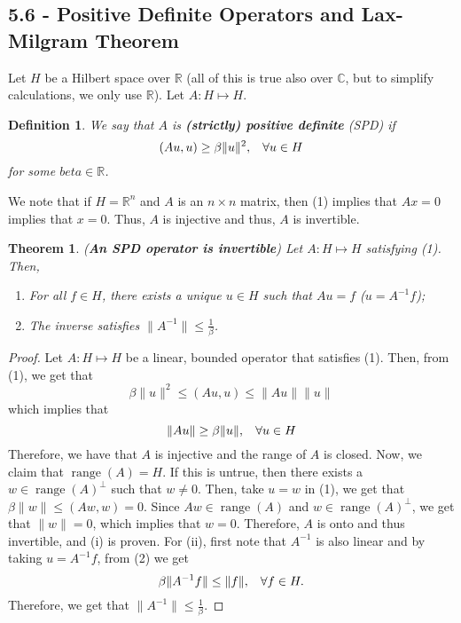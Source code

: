 \documentclass[12pt]{article}
\newtheorem{theorem}{Theorem}
\newtheorem{definition}{Definition}
\newcommand{\R}{{\mathbb R}}
\newcommand{\C}{{\mathbb C}}
\DeclareMathOperator{\range}{range}
\newcommand{\Ai}{A^{-1}}
\begin{document}
\subsection*{5.6 - Positive Definite Operators and Lax-Milgram Theorem}
\setcounter{equation}{0}
Let $H$ be a Hilbert space over $\R$ (all of this is true also over $\C$, but to simplify calculations, we only use $\R$). Let $A: H \mapsto H$.
\begin{definition}
We say that $A$ is \textbf{(strictly) positive definite} (SPD) if 
\begin{equation}
(Au, u) \geq \beta \| u \|^2, \hspace{3mm} \forall u \in H
\end{equation}
for some $beta \in \R$. 
\end{definition}
\vspace{-20pt}
We note that if $H = \R^n$ and $A$ is an $n \times n$ matrix, then (1) implies that $Ax = 0$ implies that $x = 0$. Thus, $A$ is injective and thus, $A$ is invertible. 
\begin{theorem}
(\textbf{An SPD operator is invertible}) Let $A: H \mapsto H$ satisfying (1). Then, 
\begin{enumerate}[topsep=-15pt, itemsep=0pt]
\item[(i)] For all $f \in H$, there exists a unique $u \in H$ such that $Au = f$ ($u = A^{-1} f$);
\item[(ii)] The inverse satisfies $\| A^{-1} \| \leq \frac{1}{\beta}$. 
\end{enumerate}
\end{theorem}
\vspace{-20pt}
\begin{proof}
Let $A: H \mapsto H$ be a linear, bounded operator that satisfies (1). Then, from (1), we get that 
\[ \beta \| u \|^2 \leq (Au, u) \leq \| Au \| \| u \| \]
which implies that 
\begin{equation}
\| Au \| \geq \beta \| u \|, \hspace{3mm} \forall u \in H
\end{equation}
Therefore, we have that $A$ is injective and the range of $A$ is closed. Now, we claim that $\range(A) = H$. If this is untrue, then there exists a $w \in \range(A)^{\perp}$ such that $w \neq 0$. Then, take $u = w$ in (1), we get that $\beta \| w \| \leq (Aw, w) = 0$. Since $Aw \in \range(A)$ and $w \in \range(A)^{\perp}$, we get that $\| w \| = 0$, which implies that $w = 0$. Therefore, $A$ is onto and thus invertible, and (i) is proven. For (ii), first note that $\Ai$ is also linear and by taking $u = \Ai f$, from (2) we get 
\[ \beta \| \Ai f\| \leq \| f \|, \hspace{3mm} \forall f \in H.\]
Therefore, we get that $\| \Ai \| \leq \frac{1}{\beta}.$
\end{proof}
\end{document}
